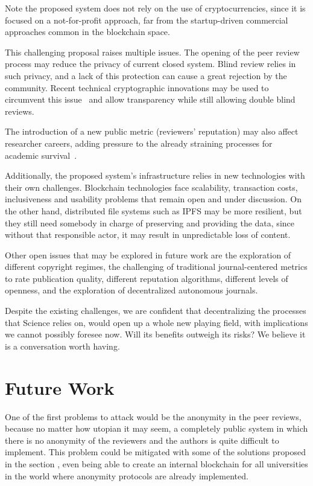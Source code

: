 Note the proposed system does not rely on the use of cryptocurrencies, since it
is focused on a not-for-profit approach, far from the startup-driven commercial
approaches common in the blockchain space.

This challenging proposal raises multiple issues. The opening of the peer review
process may reduce the privacy of current closed system. Blind review relies in
such privacy, and a lack of this protection can cause a great rejection by the
community. Recent technical cryptographic innovations may be used to circumvent
this issue~\cite{blum1988non} and allow transparency while still allowing double
blind reviews.

The introduction of a new public metric (reviewers' reputation) may also affect
researcher careers, adding pressure to the already straining processes for
academic survival~\cite{de2005publish}.

Additionally, the proposed system's infrastructure relies in new technologies
with their own challenges. Blockchain technologies face scalability, transaction
costs, inclusiveness and usability problems that remain open and under
discussion. On the other hand, distributed file systems such as IPFS may be more
resilient, but they still need somebody in charge of preserving and providing
the data, since without that responsible actor, it may result in unpredictable
loss of content.

Other open issues that may be explored in future work are the exploration of
different copyright regimes, the challenging of traditional journal-centered
metrics to rate publication quality, different reputation algorithms, different
levels of openness, and the exploration of decentralized autonomous journals.

Despite the existing challenges, we are confident that decentralizing the
processes that Science relies on, would open up a whole new playing field, with
implications we cannot possibly foresee now. Will its benefits outweigh its
risks? We believe it is a conversation worth having.

\section{Future Work}

One of the first problems to attack would be the anonymity in the peer reviews, because no matter how utopian it may seem, a completely public system in which there is no anonymity of the reviewers and the authors is quite difficult to implement. This problem could be mitigated with some of the solutions proposed in the section \label{sec:privacyReview}, even being able to create an internal blockchain for all universities in the world where anonymity protocols are already implemented.

